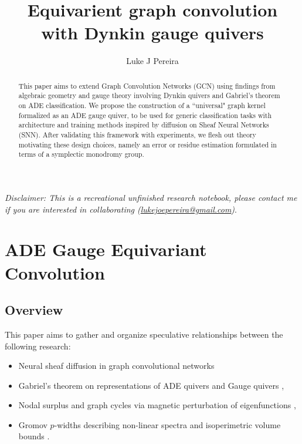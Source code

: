 \documentclass{article}
\title{\vspace{-3cm} Equivarient graph convolution \\with Dynkin gauge quivers  }
\author{Luke J Pereira}
\date{}
\theoremstyle{definition}
\begin{document}
\maketitle
\textit{
Disclaimer: This is a recreational unfinished research notebook, please contact me if you are interested in collaborating (\href{mailto:lukejoepereira@gmail.com}{lukejoepereira@gmail.com})}. \\
\begin{abstract}
\noindent
This paper aims to extend Graph Convolution Networks (GCN) using findings from algebraic geometry and gauge theory involving Dynkin quivers and Gabriel's theorem on ADE classification. We propose the construction of a ``universal" graph kernel formalized as an ADE gauge quiver, to be used for generic classification tasks with architecture and training methods inspired by diffusion on Sheaf Neural Networks (SNN). After validating this framework with experiments, we flesh out theory motivating these design choices, namely an error or residue estimation formulated in terms of a symplectic monodromy group. 

\end{abstract}
\tableofcontents
\newpage


\section{ADE Gauge Equivariant Convolution}
\subsection{Overview}
This paper aims to gather and organize speculative relationships between the following research: 
\renewcommand\labelitemi{\tiny$\bullet$}
\begin{itemize}
    \item Neural sheaf diffusion in graph convolutional networks  \cite{https://doi.org/10.48550/arxiv.2202.04579}
    \item Gabriel's theorem on representations of ADE quivers and Gauge quivers \cite{nlab:quiver},
    \item Nodal surplus and graph cycles via magnetic perturbation of eigenfunctions \cite{Berkolaiko_2013},
    \item Gromov $p$-widths describing non-linear spectra and isoperimetric volume bounds  \cite{10.1007/BFb0081739}.
\end{itemize}
\end{document}
